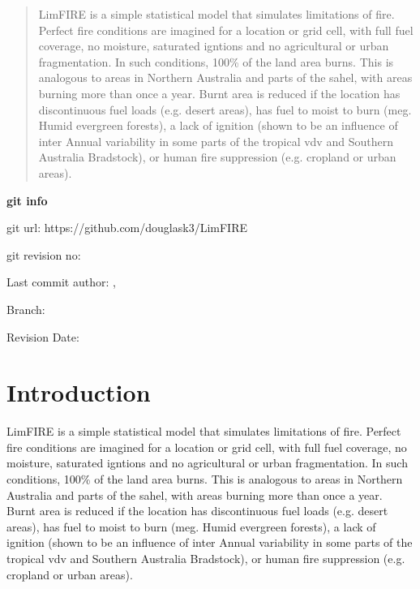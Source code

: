\documentclass[12pt]{article}
\begin{document}
\maketitle

\begin{abstract}
LimFIRE is a simple statistical model that simulates limitations of fire. Perfect fire conditions are imagined for a location or grid cell, with full fuel coverage, no moisture, saturated igntions and no agricultural or urban fragmentation. In such conditions, 100\% of the land area burns. This is analogous to areas in Northern Australia and parts of the sahel, with areas burning more than once a year. Burnt area is reduced if the location has discontinuous fuel loads  (e.g. desert areas), has fuel to moist to burn (meg. Humid evergreen forests), a lack of ignition (shown to be an influence of inter Annual variability in some parts of the tropical vdv and Southern Australia Bradstock), or human fire suppression (e.g. cropland or urban areas).
\end{abstract}

\begin{center}
    \textbf{git info}

        git url: https://github.com/douglask3/LimFIRE

	git revision no: \gitAbbrevHash

	Last commit author: \gitAuthorName,  \gitAuthorEmail

	Branch: \gitReferences

	Revision Date: \gitAuthorIsoDate
\end{center}

\section{Introduction}
LimFIRE is a simple statistical model that simulates limitations of fire. Perfect fire conditions are imagined for a location or grid cell, with full fuel coverage, no moisture, saturated igntions and no agricultural or urban fragmentation. In such conditions, 100\% of the land area burns. This is analogous to areas in Northern Australia and parts of the sahel, with areas burning more than once a year. Burnt area is reduced if the location has discontinuous fuel loads  (e.g. desert areas), has fuel to moist to burn (meg. Humid evergreen forests), a lack of ignition (shown to be an influence of inter Annual variability in some parts of the tropical vdv and Southern Australia Bradstock), or human fire suppression (e.g. cropland or urban areas).
\end{document}
